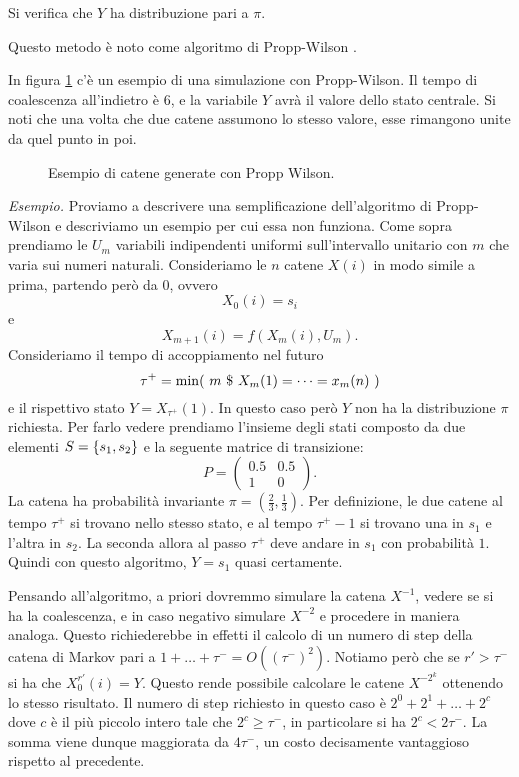 \documentclass[]{marticle}
\begin{document}
Si verifica che $Y$ ha distribuzione pari a $\pi$.

Questo metodo \`e noto come algoritmo di Propp-Wilson \cite{propp-wilson}.

In figura \ref{fig:im1} c'\`e un esempio di una simulazione con Propp-Wilson. Il
tempo di coalescenza all'indietro \`e 6, e la variabile $Y$ avr\`a il valore
dello stato centrale. Si noti che una volta che due catene assumono lo stesso
valore, esse rimangono unite da quel punto in poi.

\begin{figure}[h!]

\caption{Esempio di catene generate con Propp Wilson.}
\label{fig:im1}
\centering
\end{figure}


\textit{Esempio.} Proviamo a descrivere una semplificazione dell'algoritmo di
Propp-Wilson e descriviamo un esempio per cui essa non funziona. Come sopra
prendiamo le $U_m$ variabili indipendenti uniformi sull'intervallo unitario con
$m$ che varia sui numeri naturali. Consideriamo le $n$ catene $X(i)$ in modo
simile a prima, partendo per\`o da 0, ovvero
\[
    X_0(i) = s_i
\]
e
\[
    X_{m+1}(i) = f(X_m(i), U_m).
\]
Consideriamo il tempo di accoppiamento nel futuro
\[
    \tau^+ = \min(\ m \st X_m(1) = \dots = x_m(n)\ )
\]
e il rispettivo stato $Y = X_{\tau^+}(1)$. In questo caso per\`o $Y$ non ha la
distribuzione $\pi$ richiesta. 
Per farlo vedere prendiamo l'insieme degli stati composto da due elementi $S =
\{s_1, s_2\}$ e la seguente matrice di transizione:
\[
    P = 
    \begin{pmatrix}
        0.5 & 0.5 \\
        1  & 0
    \end{pmatrix}.
\]
La catena ha probabilit\`a invariante $\pi = (\frac{2}{3}, \frac{1}{3})$. Per
definizione, le due catene al tempo $\tau^+$ si trovano nello stesso stato, e al
tempo $\tau^+-1$ si trovano una in $s_1$ e l'altra in $s_2$. La seconda allora
al passo $\tau^+$ deve andare in $s_1$ con probabilit\`a $1$. Quindi con questo
algoritmo, $Y=s_1$ quasi certamente.

Pensando all'algoritmo, a priori dovremmo simulare la catena $X^{-1}$, vedere se
si ha la coalescenza, e in caso negativo simulare $X^{-2}$ e procedere in
maniera analoga. Questo richiederebbe in effetti il calcolo di un numero di step
della catena di Markov pari a $1+\dots+\tau^- = O((\tau^-)^2)$. Notiamo per\`o
che se $r'>\tau^-$ si ha che $X^{r'}_0(i) = Y$. Questo rende possibile calcolare
le catene $X^{-2^k}$ ottenendo lo stesso risultato. Il numero di step richiesto
in questo caso \`e $2^0+2^1 + \dots + 2^c$ dove $c$ \`e il pi\`u piccolo intero
tale che $2^c \geq \tau^-$, in particolare si ha $2^c < 2\tau^-$. La somma viene
dunque maggiorata da $4\tau^-$, un costo decisamente vantaggioso rispetto al
precedente.
\end{document}
